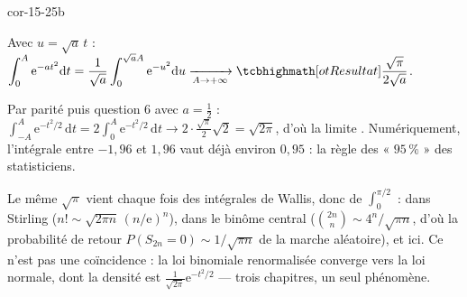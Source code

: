 \begin{blocLivre}{cor-15-25b}
\begin{corrigeSuite}
\begin{questions}[start=6]
  \item Avec $u=\sqrt a\,t$ :
    $\displaystyle\int_0^{A}\mathrm{e}^{-at^{2}}\mathrm{d}t
    =\frac{1}{\sqrt a}\int_0^{\sqrt aA}\mathrm{e}^{-u^{2}}\mathrm{d}u
    \xrightarrow[A\to+\infty]{}\res{\frac{\sqrt\pi}{2\sqrt a}}$.
  \item Par parité puis question 6 avec $a=\frac12$ :
    $\displaystyle\int_{-A}^{A}\mathrm{e}^{-t^{2}/2}\,\mathrm{d}t
    =2\int_0^{A}\mathrm{e}^{-t^{2}/2}\,\mathrm{d}t\to2\cdot\frac{\sqrt\pi}{2}\sqrt2=\sqrt{2\pi}$,
    d'où la limite . Numériquement, l'intégrale entre $-1{,}96$ et
    $1{,}96$ vaut déjà environ $0{,}95$ : la règle des « $95\,\%$ » des
    statisticiens.
  \item Le même $\sqrt\pi$ vient chaque fois des intégrales de Wallis, donc
    de $\int_0^{\pi/2}$ : dans Stirling ($n!\sim\sqrt{2\pi n}\,(n/\mathrm{e})^{n}$),
    dans le binôme central ($\binom{2n}{n}\sim4^{n}/\sqrt{\pi n}$, d'où la
    probabilité de retour $P(S_{2n}=0)\sim1/\sqrt{\pi n}$ de la marche
    aléatoire), et ici. Ce n'est pas une coïncidence : la loi binomiale
    renormalisée converge vers la loi normale, dont la densité est
    $\frac{1}{\sqrt{2\pi}}\mathrm{e}^{-t^{2}/2}$ — trois chapitres, un seul
    phénomène.
\end{questions}
\end{corrigeSuite}
\end{blocLivre}

